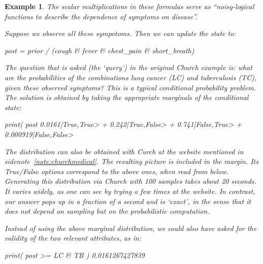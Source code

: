 \documentclass[leqno]{tufte-book} %
\newtheorem{example}[theorem]{Example}
\begin{document}
\begin{example}
\noindent The scalar multiplications in these formulas serve as
``noisy-logical functions to describe the dependence of symptoms on
disease''.

Suppose we observe all these sympotoms. Then we can update
the state to:
\begin{python}
post = prior / (cough & fever & chest_pain & short_breath)
\end{python}

\noindent The question that is asked (the `query') in the original
Church example is: what are the probabilities of the combinations lung
cancer (LC) and tuberculosis (TC), given these observed symptoms? This
is a typical conditional probability problem. The solution is obtained
by taking the appropriate marginals of the conditional state:
\begin{python}
print( post %
0.0161|True,True> + 0.242|True,False> + 0.741|False,True> + 0.000919|False,False>
\end{python}

The distribution can also be obtained with Curch at the website
mentioned in sidenote~\ref{note:churchmedical}. The resulting picture
is included in the
margin.
Its True/False options correspond to the above ones, when read from
below. Generating this distribution via Church with 100 samples takes
about 20 seconds. It varies widely, as one can see by trying a few
times at the website. In contrast, our answer pops up in a fraction of
a second and is `exact', in the sense that it does not depend on
sampling but on the probabilistic computation.

Instead of using the above marginal distribution, we could also
have asked for the validity of the two relevant attributes, as in:
\begin{python}
print( post >= LC & TB )
0.0161267427839
\end{python}


\end{example}
\end{document}
